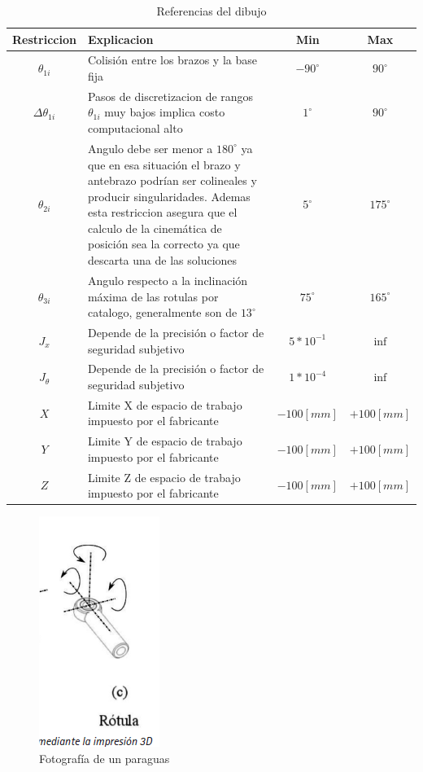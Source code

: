             \begingroup
            \renewcommand{\arraystretch}{1.5}
            \begin{table}[H]
            \centering
            \begin{tabular}{c m{7.5cm} c c}
               \hline
               \textbf{Restriccion}  & \textbf{Explicacion} & \textbf{Min}& \textbf{Max}\\
               \hline           \hline            
             $\theta_{1i}$ & Colisión entre los brazos y la base fija & $-90^{\circ}$ & $90^{\circ}$\\
            \hline
             $\Delta\theta _{1i}$ & Pasos de discretizacion de rangos $\theta_{1i}$ muy bajos implica costo computacional alto& $1^{\circ}$ & $90^{\circ}$ \\
            \hline
             $\theta _{2i}$ & Angulo debe ser menor a $180^{\circ}$ ya que en esa situación el brazo y antebrazo podrían ser colineales y producir singularidades. Ademas esta restriccion asegura que el calculo de la cinemática de posición sea la correcto ya que descarta una de las soluciones & $5^{\circ}$ & $175^{\circ}$ \\
            \hline
             $\theta _{3i}$ & Angulo respecto a la inclinación máxima de las rotulas por catalogo, generalmente son de $13^{\circ}$ & $75^{\circ}$ & $165^{\circ}$ \\
            \hline
             $J_{x}$ & Depende de la precisión o factor de seguridad subjetivo& $5*10^{-1}$ & $\inf$ \\
            \hline
             $J_{\theta}$ & Depende de la precisión o factor de seguridad subjetivo& $1*10^{-4}$ & $\inf$ \\
            \hline
             $X$ & Limite X de espacio de trabajo impuesto por el fabricante & $-100[mm]$ & $+100[mm]$ \\
            \hline            
             $Y$ & Limite Y de espacio de trabajo impuesto por el fabricante & $-100[mm]$ & $+100[mm]$ \\
            \hline   
             $Z$ & Limite Z de espacio de trabajo impuesto por el fabricante & $-100[mm]$ & $+100[mm]$ \\
            \hline   
            \end{tabular}
            \caption{Referencias del dibujo}
            \label{t:cap6_ws_1}
        \end{table}
        \endgroup     
        
         \begin{figure}[htb]
                \centering
                \includegraphics[width=0.1\linewidth]{Main/Chapter6/Images6/cap6_ws_4.png}
                \caption{Fotografía de un paraguas}
                \label{f:Cap6_ws_4}
            \end{figure}    
    
